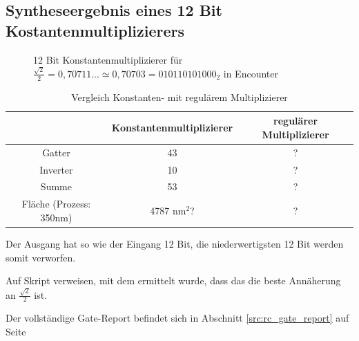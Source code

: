 \subsection{Syntheseergebnis eines 12 Bit Kostantenmultiplizierers}
\begin{figure}[!ht]
\centering  
  \caption{12 Bit Konstantenmultiplizierer für $\frac{\sqrt{2}}{2} = 0,70711... \simeq 0,70703 = 010110101000_2$ in Encounter}
\end{figure}



\begin{table}[!ht]
 \caption{Vergleich Konstanten- mit regulärem Multiplizierer}
 \label{tab:VergleichMultiplizierer}
 \begin{tabular}{ccc}
 \hline
		& Konstantenmultiplizierer 	& regulärer Multiplizierer\\
  \hline	
  Gatter			& 43				& ? \\
  Inverter			& 10				& ? \\
  Summe				& 53				& ? \\
  Fläche (Prozess: 350nm)	& 4787 nm$^2$?			& ? \\
  \hline
 \end{tabular}
\end{table}


Der Ausgang hat so wie der Eingang 12 Bit, die niederwertigsten 12 Bit werden somit verworfen.

Auf Skript verweisen, mit dem ermittelt wurde, dass das die beste Annäherung an $\frac{\sqrt{2}}{2}$ ist.

Der vollständige Gate-Report befindet sich in Abschnitt \ref{src:rc_gate_report} auf Seite \pageref{src:rc_gate_report}



